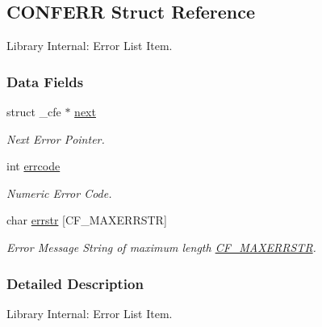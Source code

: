 \hypertarget{struct_c_o_n_f_e_r_r}{
\subsection{CONFERR Struct Reference}
\label{struct_c_o_n_f_e_r_r}
}
Library Internal: Error List Item.  


\subsubsection*{Data Fields}
\begin{CompactItemize}
\item 
\hypertarget{struct_c_o_n_f_e_r_r_01f9312e88fd2fd11acf5d854174a8f2}{
struct \_\-cfe $\ast$ \hyperlink{struct_c_o_n_f_e_r_r_01f9312e88fd2fd11acf5d854174a8f2}{next}}
\label{struct_c_o_n_f_e_r_r_01f9312e88fd2fd11acf5d854174a8f2}

\begin{CompactList}\small\item\em Next Error Pointer. \item\end{CompactList}\item 
\hypertarget{struct_c_o_n_f_e_r_r_1966ad99f7a71739f0cddb2e282eb8f4}{
int \hyperlink{struct_c_o_n_f_e_r_r_1966ad99f7a71739f0cddb2e282eb8f4}{errcode}}
\label{struct_c_o_n_f_e_r_r_1966ad99f7a71739f0cddb2e282eb8f4}

\begin{CompactList}\small\item\em Numeric Error Code. \item\end{CompactList}\item 
\hypertarget{struct_c_o_n_f_e_r_r_29ab06af0474053fff2cb208d048fd4b}{
char \hyperlink{struct_c_o_n_f_e_r_r_29ab06af0474053fff2cb208d048fd4b}{errstr} \mbox{[}CF\_\-MAXERRSTR\mbox{]}}
\label{struct_c_o_n_f_e_r_r_29ab06af0474053fff2cb208d048fd4b}

\begin{CompactList}\small\item\em Error Message String of maximum length \hyperlink{group__cflib__core_gf78e4b950c9aa49b752e4460342ea3bf}{CF\_\-MAXERRSTR}. \item\end{CompactList}\end{CompactItemize}


\subsubsection{Detailed Description}
Library Internal: Error List Item. 